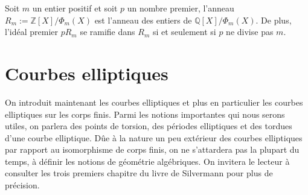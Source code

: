 \documentclass[a4paper]{article} %
\numberwithin{section}{part}
\numberwithin{equation}{section}
\newcommand\QQ{\mathbb{Q}}
\newcommand\ZZ{\mathbb{Z}}
\begin{document}
\begin{thm}
\label{th:entiercycl}
Soit $m$ un entier positif et soit $p$ un nombre premier, l'anneau $R_m := 
\ZZ[X]/\Phi_m(X)$ est l'anneau des entiers de $\QQ[X]/\Phi_m(X)$. De plus, 
l'idéal premier $pR_m$ se ramifie dans $R_m$ si et seulement si $p$ ne divise 
pas $m$.
\end{thm}
\section{Courbes elliptiques}
On introduit maintenant les courbes elliptiques et plus en particulier les
courbes elliptiques sur les corps finis. Parmi les notions importantes qui nous
serons utiles, on parlera des points de torsion, des périodes elliptiques et des
tordues d'une courbe elliptique. Dûe à la nature un peu extérieur des courbes
elliptiques par rapport au isomorphisme de corps finis, on ne s'attardera pas 
la plupart du temps, à définir les notions de géométrie algébriques. On invitera
le lecteur à consulter les trois premiers chapitre du livre de 
Silvermann\cite{Sil} pour plus de précision.
\end{document}
